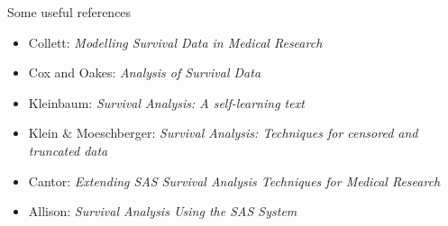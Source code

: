 \documentclass[envcountsect, 10pt, portrait, palatino]{beamer}
\begin{document}
\begin{frame}{Some useful references}
\begin{itemize}
\item Collett: {\em Modelling Survival Data in Medical Research}
\item Cox and Oakes: {\em Analysis of Survival Data}
\item Kleinbaum: {\em Survival Analysis:  A self-learning text}
\item Klein \& Moeschberger: {\em Survival Analysis:  Techniques for
censored and truncated data}
\item Cantor: {\em Extending SAS Survival Analysis Techniques for
Medical Research}
\item Allison: {\em Survival Analysis Using the SAS System}
\end{itemize}
\end{frame}
\end{document}
